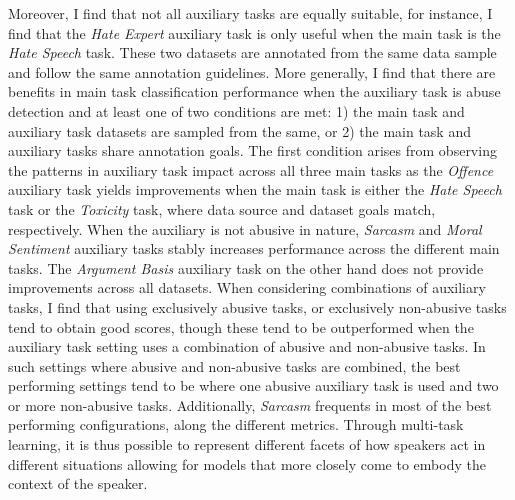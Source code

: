 Moreover, I find that not all auxiliary tasks are equally suitable, for instance, I find that the \textit{Hate Expert} auxiliary task is only useful when the main task is the \textit{Hate Speech} task. 
These two datasets are annotated from the same data sample and follow the same annotation guidelines.
More generally, I find that there are benefits in main task classification performance when the auxiliary task is abuse detection and at least one of two conditions are met:
1) the main task and auxiliary task datasets are sampled from the same, or 2) the main task and auxiliary tasks share annotation goals.
The first condition arises from observing the patterns in auxiliary task impact across all three main tasks as the \textit{Offence} auxiliary task yields improvements when the main task is either the \textit{Hate Speech} task or the \textit{Toxicity} task, where data source and dataset goals match, respectively.
When the auxiliary is not abusive in nature, \textit{Sarcasm} and \textit{Moral Sentiment} auxiliary tasks stably increases performance across the different main tasks.
The \textit{Argument Basis} auxiliary task on the other hand does not provide improvements across all datasets.
When considering combinations of auxiliary tasks, I find that using exclusively abusive tasks, or exclusively non-abusive tasks tend to obtain good scores, though these tend to be outperformed when the auxiliary task setting uses a combination of abusive and non-abusive tasks.
In such settings where abusive and non-abusive tasks are combined, the best performing settings tend to be where one abusive auxiliary task is used and two or more non-abusive tasks.
Additionally, \textit{Sarcasm} frequents in most of the best performing configurations, along the different metrics.
Through multi-task learning, it is thus possible to represent different facets of how speakers act in different situations allowing for models that more closely come to embody the context of the speaker.

